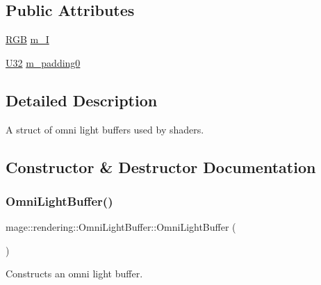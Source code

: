 \subsection*{Public Attributes}
\begin{DoxyCompactItemize}
\item 
\mbox{\hyperlink{structmage_1_1_r_g_b}{R\+GB}} \mbox{\hyperlink{structmage_1_1rendering_1_1_omni_light_buffer_a01b8cc152dd0ea2b961448ad3057a5d0}{m\+\_\+I}}
\item 
\mbox{\hyperlink{namespacemage_aa5d6eaabaac3cdd01873d6a3d27e90f3}{U32}} \mbox{\hyperlink{structmage_1_1rendering_1_1_omni_light_buffer_a3b440492e1a9fc48c6f109e5787aa4c7}{m\+\_\+padding0}}
\end{DoxyCompactItemize}


\subsection{Detailed Description}
A struct of omni light buffers used by shaders. 

\subsection{Constructor \& Destructor Documentation}
\mbox{\label{structmage_1_1rendering_1_1_omni_light_buffer_a7429503e161d324c66ecad2250bc69a2}} 
\subsubsection{\texorpdfstring{Omni\+Light\+Buffer()}{OmniLightBuffer()}\hspace{0.1cm}{\footnotesize\ttfamily [1/3]}}
{\footnotesize\ttfamily mage\+::rendering\+::\+Omni\+Light\+Buffer\+::\+Omni\+Light\+Buffer (\begin{DoxyParamCaption}{ }\end{DoxyParamCaption})\hspace{0.3cm}{\ttfamily [noexcept]}}

Constructs an omni light buffer. \mbox{\label{structmage_1_1rendering_1_1_omni_light_buffer_a716417506a93d27a0093b408e88f92e4}} 
